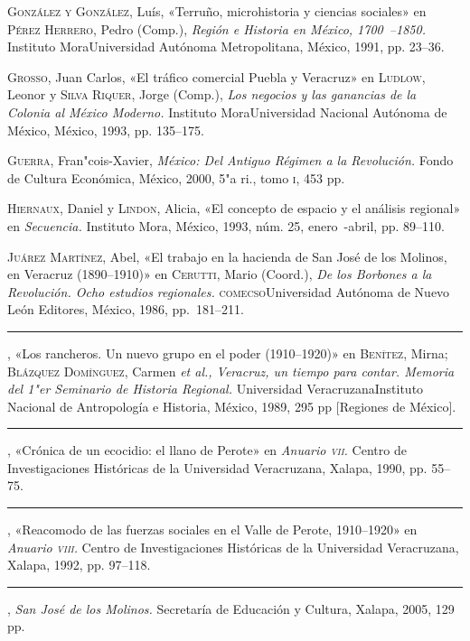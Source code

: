 \documentclass[14pt,twoside,final]{extbook} %
\begin{document}
\textsc{González y González}, Luís, «Terruño, microhistoria y ciencias sociales» en \textsc{Pérez Herrero}, Pedro (Comp.), \emph{Región e Historia en México, 1700~--1850.} Instituto Mora Universidad Autónoma Metropolitana, México, 1991, pp. 23--36.

\textsc{Grosso}, Juan Carlos, «El tráfico comercial Puebla y Veracruz» en \textsc{Ludlow}, Leonor y \textsc{Silva Riquer}, Jorge (Comp.), \emph{Los negocios y las ganancias de la Colonia al México Moderno.} Instituto Mora Universidad Nacional Autónoma de México, México, 1993, pp. 135--175.

\textsc{Guerra}, Fran"cois-Xavier, \emph{México: Del Antiguo Régimen a la Revolución.} Fondo de Cultura Económica, México, 2000, 5"a ri., tomo \textsc{i}, 453 pp.

\textsc{Hiernaux}, Daniel y \textsc{Lindon}, Alicia, «El concepto de espacio y el análisis regional» en \textit{Secuencia.} Instituto Mora, México, 1993, núm. 25, enero~-abril, pp. 89--110.

\textsc{Juárez Martínez}, Abel, «El trabajo en la hacienda de San José de los Molinos, en Veracruz (1890--1910)» en \textsc{Cerutti}, Mario (Coord.), \emph{De los Borbones a la Revolución. Ocho estudios regionales.} \textsc{comecso} Universidad Autónoma de Nuevo León Editores, México, 1986, pp.~181--211.

\rule{1cm}{0.4pt}, «Los rancheros. Un nuevo grupo en el poder (1910--1920)» en \textsc{Benítez}, Mirna; \textsc{Blázquez Domínguez}, Carmen \emph{et al., Veracruz, un tiempo para contar. Memoria del 1"er Seminario de Historia Regional.} Universidad Veracruzana Instituto Nacional de Antropología e Historia, México, 1989, 295 pp [Regiones de México].

\rule{1cm}{0.4pt}, «Crónica de un ecocidio: el llano de Perote» en \textit{Anuario \textsc{vii}.} Centro de Investigaciones Históricas de la Universidad Veracruzana, Xalapa, 1990, pp. 55--75.

\rule{1cm}{0.4pt}, «Reacomodo de las fuerzas sociales en el Valle de Perote, 1910--1920» en \textit{Anuario \textsc{viii}.} Centro de Investigaciones Históricas de la Universidad Veracruzana, Xalapa, 1992, pp. 97--118.

\rule{1cm}{0.4pt}, \emph{San José de los Molinos.} Secretaría de Educación y Cultura, Xalapa, 2005, 129 pp.
\end{document}
